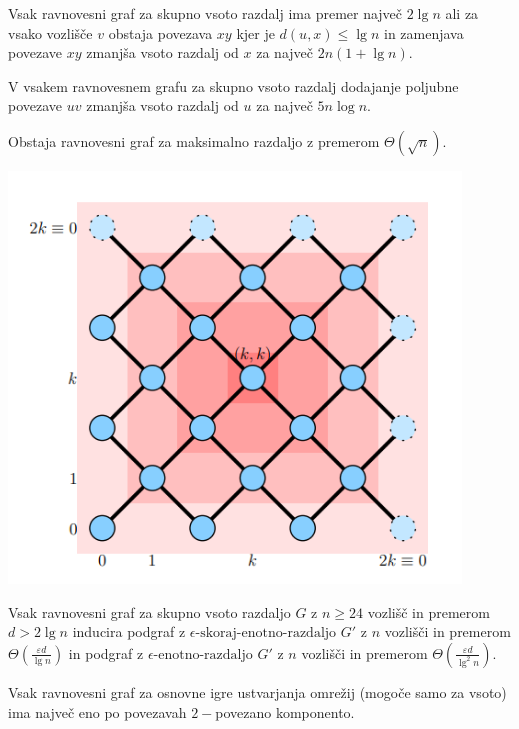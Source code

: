 \documentclass[fin1, tisk]{fmfdelo}
\begin{document}
\begin{lema}
Vsak ravnovesni graf za skupno vsoto razdalj ima premer največ $2 \lg n$ ali
za vsako vozlišče $v$ obstaja povezava $xy$ kjer je $d(u, x) \leq \lg n$ in
zamenjava povezave $xy$ zmanjša vsoto razdalj od $x$ za največ $2n(1 + \lg n)$.
\end{lema}

\begin{lema}
V vsakem ravnovesnem grafu za skupno vsoto razdalj dodajanje poljubne povezave
$uv$ zmanjša vsoto razdalj od $u$ za največ $5n \log n$.
\end{lema}

\begin{izrek}
Obstaja ravnovesni graf za maksimalno razdaljo z premerom $\Theta(\sqrt{n})$.
\end{izrek}
\includegraphics[width=0.9\textwidth]{Plagiat.png}


\begin{izrek}
Vsak ravnovesni graf za skupno vsoto razdaljo $G$ z $n \geq 24$ vozlišč in
premerom $d > 2 \lg n$ inducira podgraf z $\epsilon\text{-skoraj-enotno-razdaljo } G'$
z $n$ vozlišči in premerom $\Theta\left(\frac{\varepsilon d}{\lg n}\right)$ in
podgraf z $\epsilon\text{-enotno-razdaljo } G'$ z $n$ vozlišči in premerom
$\Theta\left(\frac{\varepsilon d}{\lg^2 n}\right)$.
\end{izrek}


\begin{izrek}
Vsak ravnovesni graf za osnovne igre ustvarjanja omrežij (mogoče samo za vsoto) ima največ eno po povezavah $2-$povezano komponento.
\end{izrek}
\end{document}
